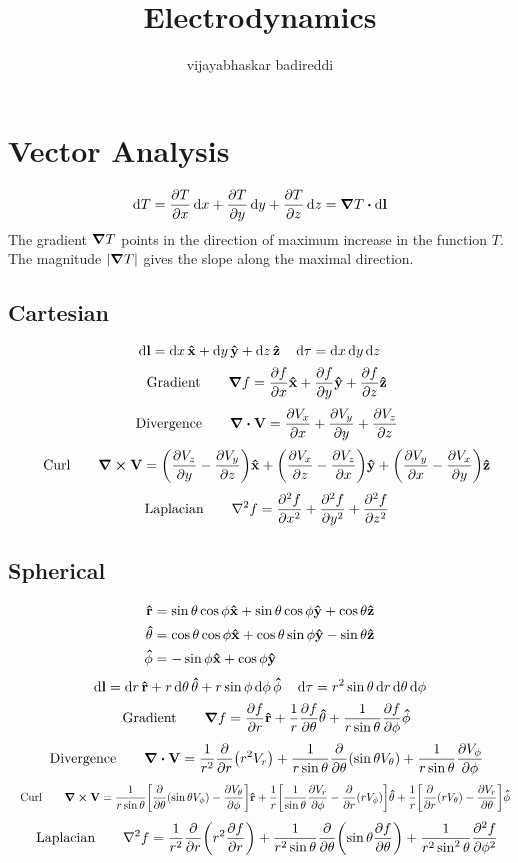 \documentclass[12pt]{article}
\title{Electrodynamics}
\author{vijayabhaskar badireddi}
\begin{document}

\section{Vector Analysis}
\[\dd{T}=\pdv{T}{x}\dd{x}+\pdv{T}{y}\dd{y}+\pdv{T}{z}\dd{z}=\grad{T}\vdot\dd{\vb{l}}\]
The gradient $\grad{T}$ points in the direction of  maximum increase in the function $T$. The magnitude $|\grad{T}|$ gives the slope along the maximal direction.
\subsection*{Cartesian}
\[\dd{\vb{l}}=\dd{x}\vu{\vb{x}}+\dd{y}\vu{\vb{y}}+\dd{z}\vu{\vb{z}}\quad\dd{\tau}=\dd{x}\dd{y}\dd{z}\]
\[\qq{Gradient}\quad\grad{f}=\pdv{f}{x}\vu{\vb{x}}+\pdv{f}{y}\vu{\vb{y}}+\pdv{f}{z}\vu{\vb{z}}\]
\[\qq{Divergence}\quad\div{\vb{V}}=\pdv{V_x}{x}+\pdv{V_y}{y}+\pdv{V_z}{z}\]
\[\qq{Curl}\quad\curl{\vb{V}}=\qty(\pdv{V_z}{y}-\pdv{V_y}{z})\vu{\vb{x}}+\qty(\pdv{V_x}{z}-\pdv{V_z}{x})\vu{\vb{y}}+\qty(\pdv{V_y}{x}-\pdv{V_x}{y})\vu{\vb{z}}\]
\[\qq{Laplacian}\quad\laplacian{f}=\pdv[2]{f}{x}+\pdv[2]{f}{y}+\pdv[2]{f}{z}\]
\subsection*{Spherical}
\begin{align*}
\vu{r}&=\sin\theta\cos\phi\vu{x}+\sin\theta\cos\phi\vu{y}+\cos\theta\vu{z}\\
\vu{\theta}&=\cos\theta\cos\phi\vu{x}+\cos\theta\sin\phi\vu{y}-\sin\theta\vu{z}\\
\vu{\phi}&=-\sin\phi\vu{x}+\cos\phi\vu{y}
\end{align*}
\[\dd{\vb{l}}=\dd{r}\vu{\vb{r}}+r\dd{\theta}\vu{\vb{\theta}}+r\sin\phi\dd{\phi}\vu{\vb{\phi}}\quad\dd{\tau}=r^2\sin\theta\dd{r}\dd{\theta}\dd{\phi}\]
\[\qq{Gradient}\quad\grad{f}=\pdv{f}{r}\vu{\vb{r}}+\frac{1}{r}\pdv{f}{\theta}\vu{\vb{\theta}}+\frac{1}{r\sin\theta}\pdv{f}{\phi}\vu{\vb{\phi}}\]
\[\qq{Divergence}\quad\div{\vb{V}}=\frac{1}{r^2}\pdv{r}\qty(r^2V_r)+\frac{1}{r\sin\theta}\pdv{\theta}\qty(\sin{\theta}V_{\theta})+\frac{1}{r\sin\theta}\pdv{V_{\phi}}{\phi}\]
\[\qq{Curl}\quad\curl{\vb{V}}=\frac{1}{r\sin\theta}\bqty{\pdv{\theta}\qty(\sin{\theta}V_{\phi})-\pdv{V_{\theta}}{\phi}}\vu{\vb{r}}+\frac{1}{r}\bqty{\frac{1}{\sin\theta}\pdv{V_r}{\phi}-\pdv{r}\qty(rV_{\phi})}\vu{\vb{\theta}}+\frac{1}{r}\bqty{\pdv{r}\qty(rV_{\theta})-\pdv{V_r}{\theta}}\vu{\vb{\phi}}\]
\[\qq{Laplacian}\quad\laplacian{f}=\frac{1}{r^2}\pdv{r}\qty(r^2\pdv{f}{r})+\frac{1}{r^2\sin\theta}\pdv{\theta}\qty(\sin{\theta}\pdv{f}{\theta})+\frac{1}{r^2\sin^2{\theta}}\pdv[2]{f}{\phi}\]
\end{document}
